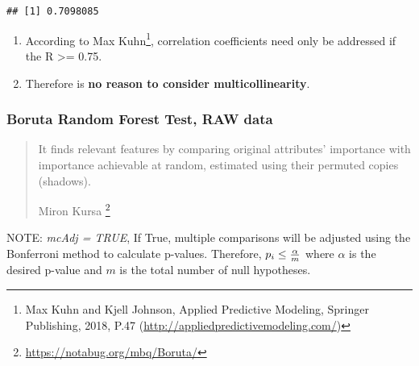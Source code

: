 \documentclass[]{article}
\newenvironment{Shaded}{\begin{snugshade}}{\end{snugshade}}
\newcommand{\CommentTok}[1]{\textcolor[rgb]{0.56,0.35,0.01}{\textit{#1}}}
\newcommand{\DecValTok}[1]{\textcolor[rgb]{0.00,0.00,0.81}{#1}}
\newcommand{\KeywordTok}[1]{\textcolor[rgb]{0.13,0.29,0.53}{\textbf{#1}}}
\newcommand{\NormalTok}[1]{#1}
\newcommand{\OperatorTok}[1]{\textcolor[rgb]{0.81,0.36,0.00}{\textbf{#1}}}
\newcommand{\StringTok}[1]{\textcolor[rgb]{0.31,0.60,0.02}{#1}}
\providecommand{\tightlist}{%
  \setlength{\itemsep}{0pt}\setlength{\parskip}{0pt}}
\begin{document}
\begin{verbatim}
## [1] 0.7098085
\end{verbatim}

\begin{enumerate}
\def\labelenumi{\arabic{enumi}.}
\setcounter{enumi}{1}
\tightlist
\item
  According to Max Kuhn\footnote{Max Kuhn and Kjell Johnson, Applied
    Predictive Modeling, Springer Publishing, 2018, P.47
    (\url{http://appliedpredictivemodeling.com/})}, correlation
  coefficients need only be addressed if the \textbar{}R\textbar{}
  \textgreater{}= 0.75.
\item
  Therefore is \textbf{no reason to consider multicollinearity}.
\end{enumerate}

\hypertarget{boruta-random-forest-test-raw-data}{%
\subsubsection{Boruta Random Forest Test, RAW
data}\label{boruta-random-forest-test-raw-data}}

\begin{quote}
It finds relevant features by comparing original attributes' importance
with importance achievable at random, estimated using their permuted
copies (shadows).

Miron Kursa \footnote{\url{https://notabug.org/mbq/Boruta/}}
\end{quote}

\begin{Shaded}
\end{Shaded}

NOTE: \emph{mcAdj = TRUE}, If True, multiple comparisons will be
adjusted using the Bonferroni method to calculate p-values. Therefore,
\(p_i \leq \large \frac {\alpha} {m}\) where \(\alpha\) is the desired
p-value and \(m\) is the total number of null hypotheses.
\end{document}
